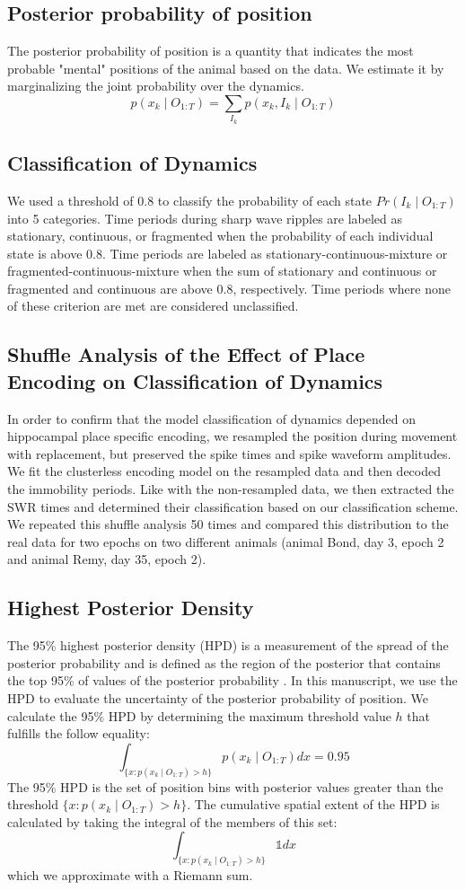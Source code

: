 \documentclass[times, twoside]{zHenriquesLab-StyleBioRxiv}
\begin{document}
\subsection*{Posterior probability of position}
The posterior probability of position is a quantity that indicates the most probable "mental" positions of the animal based on the data. We estimate it by marginalizing the joint probability over the dynamics.
$$p(x_{k} \mid O_{1:T}) = \sum_{I_{k}} p(x_{k}, I_{k} \mid O_{1:T})$$

\subsection*{Classification of Dynamics}
We used a threshold of 0.8 to classify the probability of each state $Pr(I_{k} \mid O_{1:T})$ into 5 categories. Time periods during sharp wave ripples are labeled as stationary, continuous, or fragmented when the probability of each individual state is above 0.8. Time periods are labeled as stationary-continuous-mixture or fragmented-continuous-mixture when the sum of stationary and continuous or fragmented and continuous are above 0.8, respectively. Time periods where none of these criterion are met are considered unclassified.


\subsection*{Shuffle Analysis of the Effect of Place Encoding on Classification of Dynamics}
In order to confirm that the model classification of dynamics depended on hippocampal place specific encoding, we resampled the position during movement with replacement, but preserved the spike times and spike waveform amplitudes. We fit the clusterless encoding model on the resampled data and then decoded the immobility periods. Like with the non-resampled data, we then extracted the SWR times and determined their classification based on our classification scheme. We repeated this shuffle analysis 50 times and compared this distribution to the real data for two epochs on two different animals (animal Bond, day 3, epoch 2 and animal Remy, day 35, epoch 2).

\subsection*{Highest Posterior Density}
The 95\% highest posterior density (HPD) is a measurement of the spread of the posterior probability and is defined as the region of the posterior that contains the top 95\% of values of the posterior probability \cite{CasellaStatisticalinference2001}. In this manuscript, we use the HPD to evaluate the uncertainty of the posterior probability of position. We calculate the 95\% HPD by determining the maximum threshold value $h$ that fulfills the follow equality:
$$
\int_{\{x: p(x_{k} \mid O_{1:T}) > h\}} p(x_{k} \mid O_{1:T})dx = 0.95
$$
The 95\% HPD is the set of position bins with posterior values greater than the threshold $\{x : p(x_{k} \mid O_{1:T}) > h\}$. The cumulative spatial extent of the HPD is calculated by taking the integral of the members of this set:
$$
\int_{\{x: p(x_{k} \mid O_{1:T}) > h\}} \mathbb{1}dx
$$
which we approximate with a Riemann sum.
\end{document}
